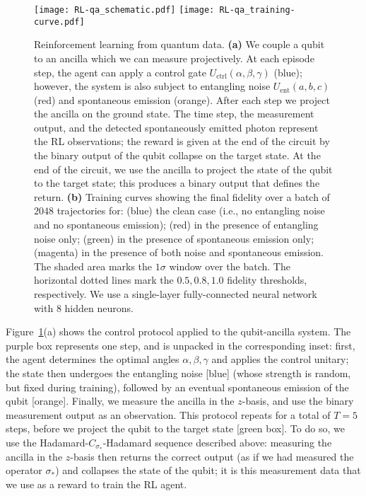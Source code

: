 \begin{figure}[t!]
\texttt{[image: RL-qa\_schematic.pdf]}
\texttt{[image: RL-qa\_training-curve.pdf]}
\caption{
Reinforcement learning from quantum data. 
\textbf{(a)} 
We couple a qubit to an ancilla which we can measure projectively. 
At each episode step, the agent can apply a control gate $U_\text{ctrl}(\alpha,\beta,\gamma)$ (blue); however, the system is also subject to entangling noise $U_\text{ent}(a,b,c)$ (red) and spontaneous emission (orange). After each step we project the ancilla on the ground state. The time step, the measurement output, and the detected spontaneously emitted photon represent the RL observations; the reward is given at the end of the circuit by the binary output of the qubit collapse on the target state. At the end of the circuit, we use the ancilla to project the state of the qubit to the target state; this produces a binary output that defines the return.
\textbf{(b)} Training curves showing the final fidelity over a batch of $2048$ trajectories for:
(blue) the clean case (i.e., no entangling noise and no spontaneous emission);
(red) in the presence of entangling noise only; 
(green) in the presence of spontaneous emission only;
(magenta) in the presence of both noise and spontaneous emission. 
The shaded area marks the $1\sigma$ window over the batch. 
The horizontal dotted lines mark the $0.5, 0.8, 1.0$ fidelity thresholds, respectively.
We use a single-layer fully-connected neural network with $8$ hidden neurons. 
}
\label{fig:RL-qdata}
\end{figure}

Figure~\ref{fig:RL-qdata}(a) shows the control protocol applied to the qubit-ancilla system. The purple box represents one step, and is unpacked in the corresponding inset: first, the agent determines the optimal angles $\alpha,\beta,\gamma$ and applies the control unitary; the state then undergoes the entangling noise [blue] (whose strength is random, but fixed during training), followed by an eventual spontaneous emission of the qubit [orange]. Finally, we measure the ancilla in the $z$-basis, and use the binary measurement output as an observation. 
This protocol repeats for a total of $T=5$ steps, before we project the qubit to the target state [green box]. To do so, we use the Hadamard-$C_{\sigma_\ast}$-Hadamard sequence described above: measuring the ancilla in the $z$-basis then returns the correct output (as if we had measured the operator $\sigma_\ast$) and collapses the state of the qubit; it is this measurement data that we use as a reward to train the RL agent. 


